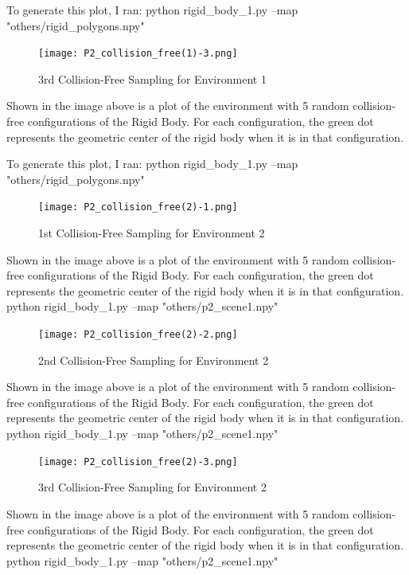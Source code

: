 \documentclass{article}
\begin{document}
To generate this plot, I ran: \newline 
python rigid\_body\_1.py --map "others/rigid\_polygons.npy"


\newpage 
\begin{figure}[h!]
	\texttt{[image: P2\_collision\_free(1)-3.png]}
	\centering
	\caption{3rd Collision-Free Sampling for Environment 1}
	\label{P2_collision_free(1)-3.png}
\end{figure}
Shown in the image above is a plot of the environment with 5 random collision-free configurations of the Rigid Body. For each configuration, the green dot represents the geometric center of the rigid body when it is in that configuration. 

To generate this plot, I ran: \newline 
python rigid\_body\_1.py --map "others/rigid\_polygons.npy"


\newpage 
\begin{figure}[h!]
	\texttt{[image: P2\_collision\_free(2)-1.png]}
	\centering
	\caption{1st Collision-Free Sampling for Environment 2}
	\label{P2_collision_free(2)-1.png}
\end{figure}
Shown in the image above is a plot of the environment with 5 random collision-free configurations of the Rigid Body. For each configuration, the green dot represents the geometric center of the rigid body when it is in that configuration. 
python rigid\_body\_1.py --map "others/p2\_scene1.npy"

\newpage 
\begin{figure}[h!]
	\texttt{[image: P2\_collision\_free(2)-2.png]}
	\centering
	\caption{2nd Collision-Free Sampling for Environment 2}
	\label{P2_collision_free(2)-2.png}
\end{figure}
Shown in the image above is a plot of the environment with 5 random collision-free configurations of the Rigid Body. For each configuration, the green dot represents the geometric center of the rigid body when it is in that configuration. 
python rigid\_body\_1.py --map "others/p2\_scene1.npy"

\newpage 
\begin{figure}[h!]
	\texttt{[image: P2\_collision\_free(2)-3.png]}
	\centering
	\caption{3rd Collision-Free Sampling for Environment 2}
	\label{P2_collision_free(2)-3.png}
\end{figure}
Shown in the image above is a plot of the environment with 5 random collision-free configurations of the Rigid Body. For each configuration, the green dot represents the geometric center of the rigid body when it is in that configuration. 
python rigid\_body\_1.py --map "others/p2\_scene1.npy"
\end{document}
